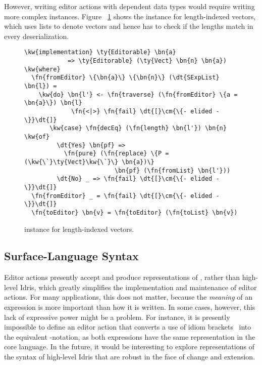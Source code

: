 However, writing editor actions with dependent data types would require writing
more complex \Editorable{} instances.  Figure ~\ref{code:editorable-vect} shows the
\Editorable{} instance for length-indexed vectors, which uses lists to denote
vectors and hence has to check if the lengths match in every deserialization.

\begin{figure}
\begin{Verbatim}
\kw{implementation} \ty{Editorable} \bn{a}
            => \ty{Editorable} (\ty{Vect} \bn{n} \bn{a}) \kw{where}
  \fn{fromEditor} \{\bn{a}\} \{\bn{n}\} (\dt{SExpList} \bn{l}) =
    \kw{do} \bn{l'} <- \fn{traverse} (\fn{fromEditor} \{a = \bn{a}\}) \bn{l}
             \fn{<|>} \fn{fail} \dt{[}\cm{\{- elided -\}}\dt{]}
       \kw{case} \fn{decEq} (\fn{length} \bn{l'}) \bn{n} \kw{of}
         \dt{Yes} \bn{pf} =>
           \fn{pure} (\fn{replace} \{P = (\kw{\`}\ty{Vect}\kw{\`}\} \bn{a})\}
                         \bn{pf} (\fn{fromList} \bn{l'}))
         \dt{No} _ => \fn{fail} \dt{[}\cm{\{- elided -\}}\dt{]}
  \fn{fromEditor} _ = \fn{fail} \dt{[}\cm{\{- elided -\}}\dt{]}
  \fn{toEditor} \bn{v} = \fn{toEditor} (\fn{toList} \bn{v})
\end{Verbatim}
\caption{\Editorable{} instance for length-indexed vectors.}
\label{code:editorable-vect}
\end{figure}


\subsection{Surface-Language Syntax}

Editor actions presently accept and produce representations of \TT{},
rather than high-level Idris, which greatly simplifies the
implementation and maintenance of editor actions. For many
applications, this does not matter, because the \emph{meaning} of an
expression is more important than how it is written. In some cases,
however, this lack of expressive power might be a problem. For
instance, it is presently impossible to define an editor action that
converts a use of idiom brackets~\citep{Applicative} into the
equivalent -notation, as both expressions have the same
representation in the core language. In the future, it would be
interesting to explore representations of the syntax of high-level
Idris that are robust in the face of change and extension.



